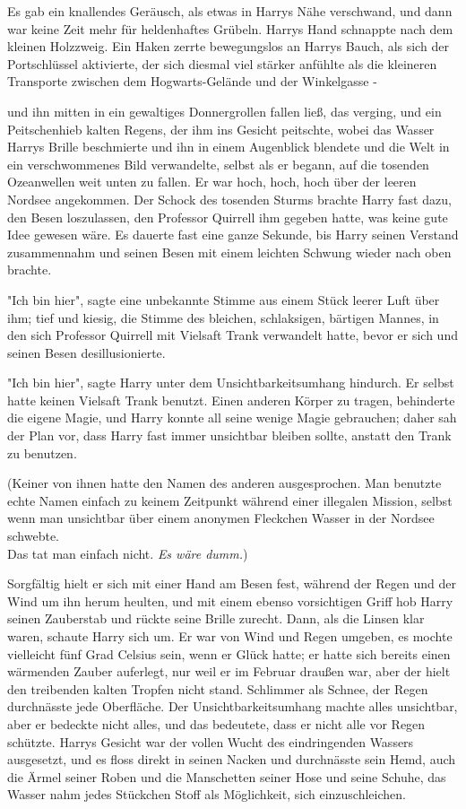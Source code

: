 {Es gab ein knallendes Geräusch, als etwas in Harrys Nähe verschwand, und dann war keine Zeit mehr für heldenhaftes Grübeln. Harrys Hand schnappte nach dem kleinen Holzzweig. Ein Haken zerrte bewegungslos an Harrys Bauch, als sich der Portschlüssel aktivierte, der sich diesmal viel stärker anfühlte als die kleineren Transporte zwischen dem Hogwarts-Gelände und der Winkelgasse -

und ihn mitten in ein gewaltiges Donnergrollen fallen ließ, das verging, und ein Peitschenhieb kalten Regens, der ihm ins Gesicht peitschte, wobei das Wasser Harrys Brille beschmierte und ihn in einem Augenblick blendete und die Welt in ein verschwommenes Bild verwandelte, selbst als er begann, auf die tosenden Ozeanwellen weit unten zu fallen. Er war hoch, hoch, hoch über der leeren Nordsee angekommen. Der Schock des tosenden Sturms brachte Harry fast dazu, den Besen loszulassen, den Professor Quirrell ihm gegeben hatte, was keine gute Idee gewesen wäre. Es dauerte fast eine ganze Sekunde, bis Harry seinen Verstand zusammennahm und seinen Besen mit einem leichten Schwung wieder nach oben brachte.

"Ich bin hier", sagte eine unbekannte Stimme aus einem Stück leerer Luft über ihm; tief und kiesig, die Stimme des bleichen, schlaksigen, bärtigen Mannes, in den sich Professor Quirrell mit Vielsaft Trank verwandelt hatte, bevor er sich und seinen Besen desillusionierte.

"Ich bin hier", sagte Harry unter dem Unsichtbarkeitsumhang hindurch. Er selbst hatte keinen Vielsaft Trank benutzt. Einen anderen Körper zu tragen, behinderte die eigene Magie, und Harry konnte all seine wenige Magie gebrauchen; daher sah der Plan vor, dass Harry fast immer unsichtbar bleiben sollte, anstatt den Trank zu benutzen.

(Keiner von ihnen hatte den Namen des anderen ausgesprochen. Man benutzte echte Namen einfach zu keinem Zeitpunkt während einer illegalen Mission, selbst wenn man unsichtbar über einem anonymen Fleckchen Wasser in der Nordsee schwebte.\\ Das tat man einfach nicht. \emph{Es wäre dumm.})

Sorgfältig hielt er sich mit einer Hand am Besen fest, während der Regen und der Wind um ihn herum heulten, und mit einem ebenso vorsichtigen Griff hob Harry seinen Zauberstab und rückte seine Brille zurecht. Dann, als die Linsen klar waren, schaute Harry sich um. Er war von Wind und Regen umgeben, es mochte vielleicht fünf Grad Celsius sein, wenn er Glück hatte; er hatte sich bereits einen wärmenden Zauber auferlegt, nur weil er im Februar draußen war, aber der hielt den treibenden kalten Tropfen nicht stand. Schlimmer als Schnee, der Regen durchnässte jede Oberfläche. Der Unsichtbarkeitsumhang machte alles unsichtbar, aber er bedeckte nicht alles, und das bedeutete, dass er nicht alle vor Regen schützte. Harrys Gesicht war der vollen Wucht des eindringenden Wassers ausgesetzt, und es floss direkt in seinen Nacken und durchnässte sein Hemd, auch die Ärmel seiner Roben und die Manschetten seiner Hose und seine Schuhe, das Wasser nahm jedes Stückchen Stoff als Möglichkeit, sich einzuschleichen.

}
